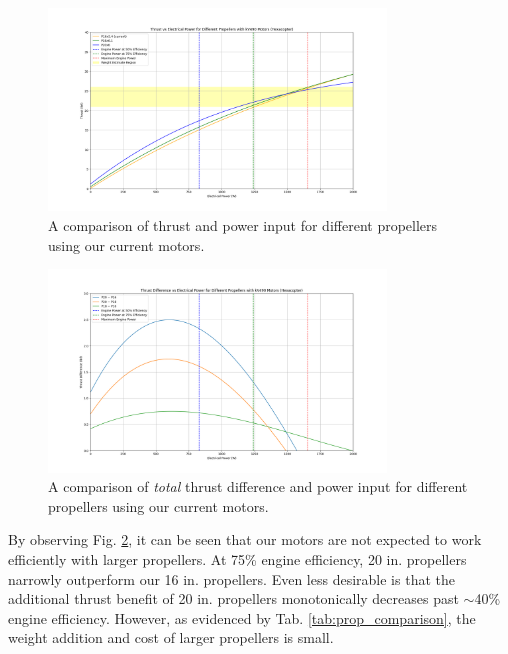 \documentclass{article}
\begin{document}
\begin{figure}[htbp]
    \centering
    \includegraphics[width=0.8\textwidth]{Prop Comparison (kV490).png}
    \caption{A comparison of thrust and power input for different propellers using our current motors.}
    \label{fig:prop_comparison_kv490}
\end{figure}
\begin{figure}[htbp]
    \centering
    \includegraphics[width=0.8\textwidth]{Prop Difference Comparison (kV490).png}
    \caption{A comparison of \textit{total} thrust difference and power input for different propellers using our current motors.}
    \label{fig:prop_difference_comparison_kv490}
\end{figure}

By observing Fig. \ref{fig:prop_difference_comparison_kv490}, it can be seen that our motors are not expected to work efficiently with larger propellers. At 75\% engine efficiency, 20 in. propellers narrowly outperform our 16 in. propellers. Even less desirable is that the additional thrust benefit of 20 in. propellers monotonically decreases past $\sim$40\% engine efficiency. However, as evidenced by Tab. \ref{tab:prop_comparison}, the weight addition and cost of larger propellers is small.
\end{document}
